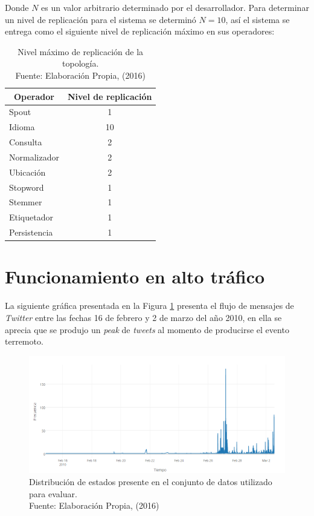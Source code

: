 Donde $N$ es un valor arbitrario determinado por el desarrollador. Para determinar un nivel de replicación para el sistema se determinó $N = 10$, así el sistema se entrega como el siguiente nivel de replicación máximo en sus operadores:

\begin{table}[]
\centering
\caption[Nivel máximo de replicación de la topología.]{Nivel máximo de replicación de la topología.\\Fuente: Elaboración Propia, (2016)}
\label{tab:topologiaFinal}
\begin{tabular}{|l|c|}
\hline
\multicolumn{1}{|c|}{\textbf{Operador}} & \textbf{Nivel de replicación} \\ \hline
Spout & 1 \\ \hline
Idioma & 10 \\ \hline
Consulta & 2 \\ \hline
Normalizador & 2 \\ \hline
Ubicación & 2 \\ \hline
Stopword & 1 \\ \hline
Stemmer & 1 \\ \hline
Etiquetador & 1 \\ \hline
Persistencia & 1 \\ \hline
\end{tabular}
\end{table} 

\section{Funcionamiento en alto tráfico}
\label{sec:AltoTrafico}

La siguiente gráfica presentada en la Figura \ref{fig:graficoDeTweets} presenta el flujo de mensajes de \textit{Twitter} entre las fechas 16 de febrero y 2 de marzo del año 2010, en ella se aprecia que se produjo un \textit{peak} de \textit{tweets} al momento de producirse el evento terremoto.

\begin{figure}[H]
        \centering
        \captionsetup{justification=centering}
        \includegraphics[scale=0.6]{images/GraficoTweetsHastaEventoZoom1.png}
        \caption[Distribución de estados presente en el conjunto de datos utilizado para evaluar.]{Distribución de estados presente en el conjunto de datos utilizado para evaluar.\\Fuente: Elaboración Propia, (2016)}
        \label{fig:graficoDeTweets}
\end{figure}

